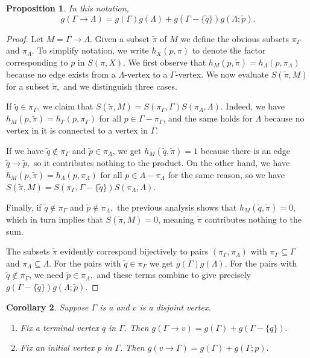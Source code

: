 \documentclass{article}
\newcommand{\qo}{\tilde{q}}
\newcommand{\pin}{\tilde{p}}
\newcommand{\tilpi}{\tilde{\pi}}
\newcommand{\piga}{\pi_\Gamma}
\newcommand{\pila}{\pi_\Lambda}
\theoremstyle{plain}
\newtheorem{prop}{Proposition}[section]
\newtheorem{cor}[prop]{Corollary}
\theoremstyle{definition}
\begin{document}
\begin{prop}
	In this notation, \eqnspace \begin{equation*} g(\Gamma \rightarrow \Lambda) = g(\Gamma)g(\Lambda) + g(\Gamma - \{\qo\})g(\Lambda; \pin). \end{equation*}
\end{prop}
\begin{proof}
	Let $M = \Gamma \rightarrow \Lambda.$ Given a subset $\tilpi$ of $M$ we define the obvious subsets $\piga$ and $\pila.$ To simplify notation, we write $h_X(p, \pi)$ to denote the factor corresponding to $p$ in $S(\pi, X).$ We first observe that $h_M(p, \tilpi) = h_\Lambda(p, \pila)$ because no edge exists from a $\Lambda$-vertex to a $\Gamma$-vertex. We now evaluate $S(\tilpi, M)$ for a subset $\tilpi,$ and we distinguish three cases.
	
	
	If $\qo \in \piga$, we claim that $S(\tilpi, M) = S(\piga, \Gamma)S(\pila, \Lambda)$. Indeed, we have $h_M(p, \tilpi) = h_\Gamma(p, \piga)$ for all $p \in \Gamma - \piga$, and the same holds for $\Lambda$ because no vertex in it is connected to a vertex in $\Gamma$.
	
	If we have $\qo\notin\piga$ and $\pin \in \pila$, we get $h_M(\qo, \tilpi) = 1$ because there is an edge $\qo \rightarrow \pin,$ so it contributes nothing to the product. On the other hand, we have $h_M(p, \tilpi) = h_\Lambda(p, \pila)$ for all $p \in \Lambda - \pila$ for the same reason, so we have $S(\tilpi, M) = S(\piga, \Gamma - \{\qo\})S(\pila, \Lambda)$.
	
	Finally, if $\qo \notin \piga$ and $\pin\notin\pila,$ the previous analysis shows that $h_M(\qo, \tilpi) = 0$, which in turn implies that $S(\tilpi, M) = 0$, meaning $\tilpi$ contributes nothing to the sum.
	
	The subsets $\tilpi$ evidently correspond bijectively to pairs $(\piga, \pila)$ with $\piga \subseteq \Gamma$ and $\pila \subseteq \Lambda.$ For the pairs with $\qo \in \piga$ we get $g(\Gamma)g(\Lambda)$. For the pairs with $\qo \notin \piga$, we need $\pin \in \pila,$ and these terms combine to give precisely $g(\Gamma - \{\qo\})g(\Lambda; \pin).$
\end{proof}

\begin{cor} Suppose $\Gamma$ is a  and $v$ is a disjoint vertex.\listspace
	\begin{enumerate} \listspace
		\item Fix a terminal vertex $q$ in $\Gamma$. Then $g(\Gamma \rightarrow v) = g(\Gamma) + g(\Gamma - \{q\}).$
		\item Fix an initial vertex $p$ in $\Gamma.$ Then $g(v \rightarrow \Gamma) = g(\Gamma) + g(\Gamma; p).$
	\end{enumerate}\textspace
\end{cor}
\end{document}
